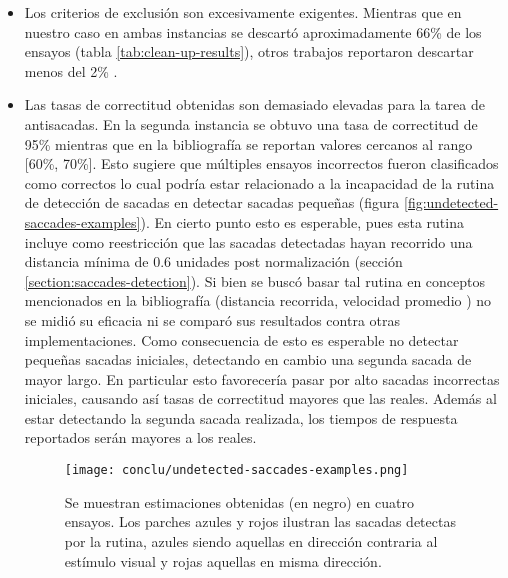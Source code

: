   \begin{itemize}

    \item
      Los criterios de exclusión son excesivamente exigentes.
      Mientras que en nuestro caso en ambas instancias se descartó
      aproximadamente 66\% de los ensayos (tabla \ref{tab:clean-up-results}),
      otros trabajos reportaron descartar menos del 2\%
      \cite{unsworth_2011_distribution_analysis}.

    \item
      Las tasas de correctitud obtenidas son demasiado elevadas para la tarea
      de antisacadas.
      En la segunda instancia se obtuvo una tasa de correctitud de 95\%
      mientras que en la bibliografía se reportan valores cercanos al rango
      [60\%, 70\%].
      Esto sugiere que múltiples ensayos incorrectos fueron clasificados como
      correctos lo cual podría estar relacionado a la incapacidad de la rutina
      de detección de sacadas en detectar sacadas pequeñas (figura
      \ref{fig:undetected-saccades-examples}).
      En cierto punto esto es esperable, pues esta rutina incluye como
      reestricción que las sacadas detectadas hayan recorrido una distancia
      mínima de 0.6 unidades post normalización (sección
      \ref{section:saccades-detection}).
      Si bien se buscó basar tal rutina en conceptos mencionados en la
      bibliografía (distancia recorrida, velocidad promedio
      \cite{stuart_2019_saccade_detection_algorithms}) no se midió su eficacia
      ni se comparó sus resultados contra otras implementaciones.
      Como consecuencia de esto es esperable no detectar pequeñas sacadas
      iniciales, detectando en cambio una segunda sacada de mayor largo.
      En particular esto favorecería pasar por alto sacadas incorrectas
      iniciales, causando así tasas de correctitud mayores que las reales.
      Además al estar detectando la segunda sacada realizada, los tiempos de
      respuesta reportados serán mayores a los reales.


      \begin{figure}
        \centering

        \texttt{[image: conclu/undetected-saccades-examples.png]}

        Se muestran estimaciones obtenidas (en negro) en cuatro ensayos.
        Los parches azules y rojos ilustran las sacadas detectas por la rutina,
        azules siendo aquellas en dirección contraria al estímulo visual y
        rojas aquellas en misma dirección.


\end{figure}
\end{itemize}
